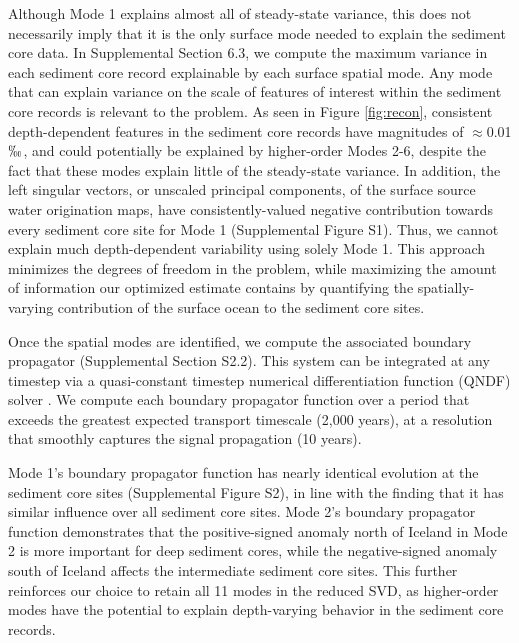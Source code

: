 \documentclass[draft]{agujournal2019}
\begin{document}
Although Mode 1 explains almost all of steady-state variance,
this does not necessarily imply that it is the only
surface mode needed to explain the sediment core data.
In Supplemental Section 6.3, we compute the maximum variance in
  each sediment core record explainable by each surface spatial mode.
  Any mode that can explain variance on the scale of features of interest within
  the sediment core records is relevant to the problem. As seen in
  Figure \ref{fig:recon}, consistent depth-dependent features in the
  sediment core records  have magnitudes of $\approx$0.01$\permil$, and could potentially
  be explained by higher-order
  Modes 2-6, despite the fact that these modes explain little of the
  steady-state variance.
In addition, the left singular vectors, or unscaled principal components,
of the surface source water origination maps,
have consistently-valued negative contribution
towards every sediment core site for Mode 1 (Supplemental Figure
 S1). %
Thus, we cannot explain 
much depth-dependent variability using solely Mode 1.
This approach minimizes the degrees of freedom in the problem, while
maximizing the amount of information our optimized estimate contains
by quantifying the spatially-varying contribution of the surface ocean
to the sediment core sites. 

Once the spatial modes are identified, we compute the associated
boundary propagator (Supplemental Section S2.2).
This system can be
integrated at any timestep via a quasi-constant timestep
numerical differentiation function (QNDF) solver
\cite[]{doi:10.1137/S1064827594276424}. We compute each boundary propagator function over a period that exceeds the greatest
expected transport timescale (2,000 years), at a resolution that smoothly captures
the signal propagation (10 years).

Mode 1's boundary propagator function has nearly
identical evolution at the sediment core sites (Supplemental Figure
S2), %
in line with the finding that it has similar
influence over all sediment core sites. Mode 2's boundary propagator function demonstrates that the positive-signed anomaly north of
Iceland in Mode 2 is more important for deep sediment cores, while the
negative-signed anomaly south of Iceland affects the intermediate
sediment core sites. This further reinforces our choice to retain all
11 modes in the reduced SVD, as higher-order modes have the potential
to explain depth-varying behavior in the sediment core records.
\end{document}
